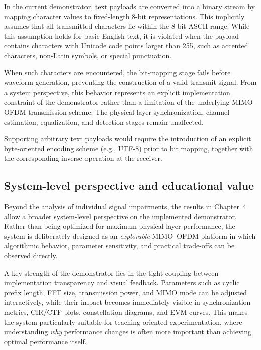 In the current demonstrator, text payloads are converted into a binary stream by mapping character values to fixed-length 8-bit representations. This implicitly assumes that all transmitted characters lie within the 8-bit ASCII range. While this assumption holds for basic English text, it is violated when the payload contains characters with Unicode code points larger than 255, such as accented characters, non-Latin symbols, or special punctuation.

When such characters are encountered, the bit-mapping stage fails before waveform generation, preventing the construction of a valid transmit signal. From a system perspective, this behavior represents an explicit implementation constraint of the demonstrator rather than a limitation of the underlying MIMO--OFDM transmission scheme. The physical-layer synchronization, channel estimation, equalization, and detection stages remain unaffected.

Supporting arbitrary text payloads would require the introduction of an explicit byte-oriented encoding scheme (e.g., UTF-8) prior to bit mapping, together with the corresponding inverse operation at the receiver. 

\subsection{System-level perspective and educational value}
\label{sec:discussion_system_level}

Beyond the analysis of individual signal impairments, the results in Chapter~4 allow a broader system-level perspective on the implemented demonstrator. Rather than being optimized for maximum physical-layer performance, the system is deliberately designed as an \emph{explorable} MIMO--OFDM platform in which algorithmic behavior, parameter sensitivity, and practical trade-offs can be observed directly.

A key strength of the demonstrator lies in the tight coupling between implementation transparency and visual feedback. Parameters such as cyclic prefix length, FFT size, transmission power, and MIMO mode can be adjusted interactively, while their impact becomes immediately visible in synchronization metrics, CIR/CTF plots, constellation diagrams, and EVM curves. This makes the system particularly suitable for teaching-oriented experimentation, where understanding \emph{why} performance changes is often more important than achieving optimal performance itself.

